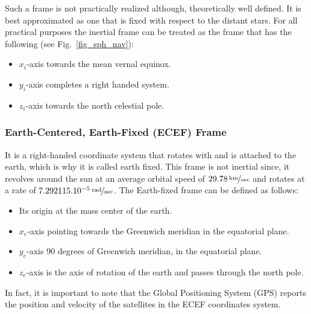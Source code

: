 \documentclass[journal]{IEEEtran}
\begin{document}
Such a frame is not practically realized although, theoretically well defined. It is best approximated as one that is fixed with respect to the distant stars. For all practical purposes the inertial frame can be treated as the frame that has the following (see Fig.~\ref{fig_sph_nav}):
\begin{itemize}
	\item $x_i$-axis towards the mean vernal equinox.
    \item $y_i$-axis completes a right handed system.
     \item $z_i$-axis towards the north celestial pole.
\end{itemize}




%
\subsubsection{Earth-Centered, Earth-Fixed (ECEF) Frame}
It is a right-handed coordinate system that rotates with and is attached to the earth, which is why it is called earth fixed.
This frame is not inertial since, it revolves  around the sun  at an average orbital speed of $\unitfrac[29.78]{km}{sec}$ and rotates at a rate of $\unitfrac[7.292115 . 10^{-5}]{rad}{sec}$. The Earth-fixed frame can be defined as follows:  
\begin{itemize}
	\item Its origin at the mass center of the earth.
    \item $x_e$-axis pointing towards the Greenwich meridian in the equatorial plane.
     \item $y_e$-axis 90 degrees of Greenwich meridian, in the equatorial plane.
     \item $z_e$-axis is the axis of rotation of the earth and passes through the north pole.
\end{itemize}
In fact, it is important to note that the Global Positioning System (GPS) reports the position and velocity of the satellites in the ECEF coordinates system.\\



%
\end{document}
